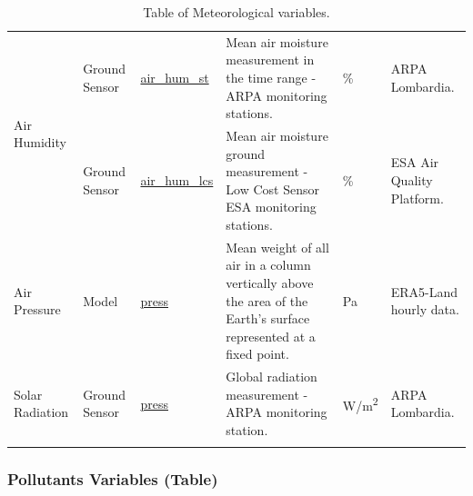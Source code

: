 \begin{center}
\begin{longtable}{ |p{2.3cm}|p{1.5cm}|p{2.3cm}|p{4cm}|p{1cm}|p{2.3cm}| }
\multirow{2}{4em}{Air Humidity} & Ground \newline Sensor  & \underline{air\_hum\_st} & Mean air moisture measurement in the time range - ARPA monitoring stations.\par & \% & ARPA \newline Lombardia.\\ 
& Ground \newline Sensor  & \underline{air\_hum\_lcs} &  Mean air moisture ground measurement - Low Cost Sensor ESA monitoring stations.\par & \% & ESA Air Quality Platform.\\ \hline

\multirow{1}{4em}{Air Pressure} & Model   & \underline{press} & Mean weight of all air in a column vertically above the area of the Earth's surface represented at a fixed point.\par & Pa & ERA5-Land hourly data.\\ \hline

\multirow{1}{4em}{Solar Radiation} & Ground \newline Sensor  & \underline{press} & Global radiation measurement - ARPA monitoring station.\par & W/m\textsuperscript{2} & ARPA \newline Lombardia.\\ \hline

\hline
\caption{Table of Meteorological variables.}

\end{longtable}
\end{center}

\subsubsection{Pollutants Variables (Table)}


